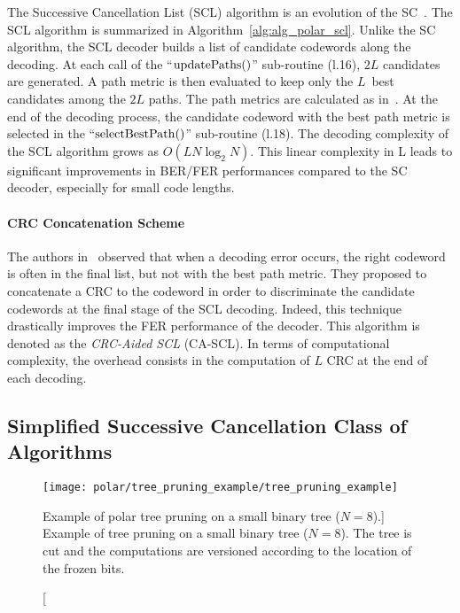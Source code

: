 The Successive Cancellation List (SCL) algorithm is an evolution of the
SC~\cite{Tal2011}. The SCL algorithm is summarized in
Algorithm~\ref{alg:alg_polar_scl}. Unlike the SC algorithm, the SCL decoder
builds a list of candidate codewords along the decoding. At each call of the
``$\operatorname*{updatePaths}()$'' sub-routine (l.16), $2L$ candidates are generated. A
path metric is then evaluated to keep only the $L$~best candidates among the
$2L$ paths. The path metrics are calculated as
in~\cite{Balatsoukas-Stimming2015}. At the end of the decoding process, the
candidate codeword with the best path metric is selected in the
``$\operatorname*{selectBestPath}()$'' sub-routine (l.18). The decoding complexity of the
SCL algorithm grows as $O(LN\log_2N)$. This linear complexity in L leads to
significant improvements in BER/FER performances compared to the SC decoder,
especially for small code lengths.

\paragraph{CRC Concatenation Scheme}

The authors in~\cite{Tal2011} observed that when a decoding error occurs, the
right codeword is often in the final list, but not with the best path metric.
They proposed to concatenate a CRC to the codeword in order to discriminate the
candidate codewords at the final stage of the SCL decoding. Indeed, this
technique drastically improves the FER performance of the decoder. This
algorithm is denoted as the \emph{CRC-Aided SCL} (CA-SCL). In terms of
computational complexity, the overhead consists in the computation of $L$ CRC at
the end of each decoding.

\subsection{Simplified Successive Cancellation Class of Algorithms}
\label{sec:alg_polar_simplified_decoders}

\begin{figure}[htp]
  \centering
  \texttt{[image: polar/tree\_pruning\_example/tree\_pruning\_example]}
  \caption
    [Example of polar tree pruning on a small binary tree ($N = 8$).]
    {Example of tree pruning on a small binary tree ($N = 8$). The tree is cut
    and the computations are versioned according to the location of the frozen
    bits.}
  \label{fig:tree_pruning_example}
\end{figure}

